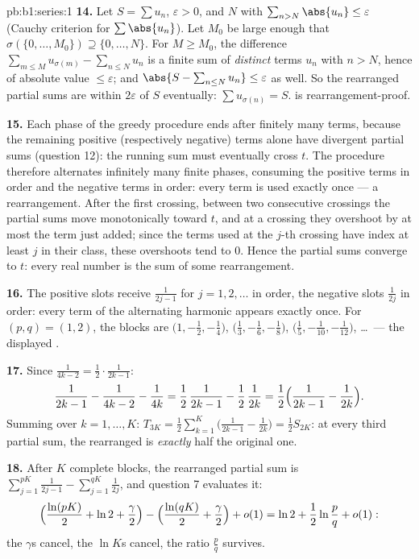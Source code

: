 \begin{solution}{pb:b1:series:1}
\textbf{14.} Let $S = \sum u_n$, $\varepsilon > 0$, and $N$ with
$\sum_{n > N} \abs{u_n} \leq \varepsilon$ (Cauchy criterion for
$\sum\abs{u_n}$). Let $M_0$ be large enough that $\sigma(\{0,
\dots, M_0\}) \supseteq \{0, \dots, N\}$. For $M \geq M_0$, the
difference $\sum_{m \leq M} u_{\sigma(m)} - \sum_{n \leq N} u_n$
is a finite sum of \emph{distinct} terms $u_n$ with $n > N$,
hence of absolute value $\leq \varepsilon$; and $\abs{S -
\sum_{n\leq N} u_n} \leq \varepsilon$ as well. So the rearranged
partial sums are within $2\varepsilon$ of $S$ eventually:
$\sum u_{\sigma(n)} = S$.  is
rearrangement-proof.

\textbf{15.} Each phase of the greedy procedure ends after
finitely many terms, because the remaining positive
(respectively negative) terms alone have divergent partial sums
(question 12): the running sum must eventually cross $t$. The
procedure therefore alternates infinitely many finite phases,
consuming the positive terms in order and the negative terms in
order: every term is used exactly once --- a rearrangement.
After the first crossing, between two consecutive crossings the
partial sums move monotonically toward $t$, and at a crossing
they overshoot by at most the term just added; since the terms
used at the $j$-th crossing have index at least $j$ in their
class, these overshoots tend to $0$. Hence the partial sums
converge to $t$: every real number is the sum of some
rearrangement.

\textbf{16.} The positive slots receive $\frac{1}{2j-1}$ for
$j = 1, 2, \dots$ in order, the negative slots $\frac{1}{2j}$ in
order: every term of the alternating harmonic  appears
exactly once. For $(p, q) = (1, 2)$, the blocks are
$\bigl(1, -\frac12, -\frac14\bigr)$, $\bigl(\frac13, -\frac16,
-\frac18\bigr)$, $\bigl(\frac15, -\frac1{10},
-\frac1{12}\bigr)$, \dots\ --- the displayed .

\textbf{17.} Since $\frac{1}{4k-2} = \frac12\cdot\frac{1}{2k-1}$:
\[
\frac{1}{2k-1} - \frac{1}{4k-2} - \frac{1}{4k}
= \frac12\,\frac{1}{2k-1} - \frac12\,\frac{1}{2k}
= \frac12\Bigl(\frac{1}{2k-1} - \frac{1}{2k}\Bigr).
\]
Summing over $k = 1, \dots, K$: $T_{3K} = \frac12
\sum_{k=1}^{K}\bigl(\frac{1}{2k-1} - \frac{1}{2k}\bigr) =
\frac12 S_{2K}$: at every third partial sum, the rearranged
 is \emph{exactly} half the original one.

\textbf{18.} After $K$ complete blocks, the rearranged partial
sum is $\sum_{j=1}^{pK}\frac{1}{2j-1} -
\sum_{j=1}^{qK}\frac{1}{2j}$, and question 7 evaluates it:
\[
\Bigl(\frac{\ln(pK)}{2} + \ln 2 + \frac\gamma2\Bigr)
- \Bigl(\frac{\ln(qK)}{2} + \frac\gamma2\Bigr) + o(1)
= \ln 2 + \frac12\ln\frac pq + o(1) :
\]
the $\gamma$s cancel, the $\ln K$s cancel, the ratio
$\frac pq$ survives.


\end{solution}
